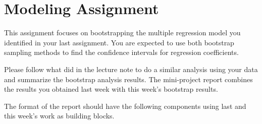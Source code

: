 \documentclass[
]{book}
\begin{document}
\hypertarget{modeling-assignment}{%
\section{Modeling Assignment}\label{modeling-assignment}}

This assignment focuses on bootstrapping the multiple regression model you identified in your last assignment. You are expected to use both bootstrap sampling methods to find the confidence intervals for regression coefficients.

Please follow what did in the lecture note to do a similar analysis using your data and summarize the bootstrap analysis results. The mini-project report combines the results you obtained last week with this week's bootstrap results.

The format of the report should have the following components using last and this week's work as building blocks.
\end{document}
